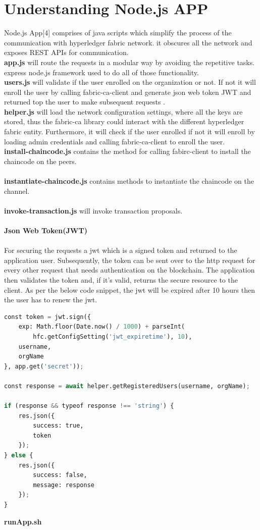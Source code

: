 \section{Understanding Node.js APP} 
Node.js App[4] comprises of java scripts which simplify the process of the communication with hyperledger fabric network. it obscures all the network and exposes REST APIs for communication.
\ \\ 
\textbf{app.js} will route the requests in a modular way by avoiding the repetitive tasks. express node.js framework used to do all of those functionality. 
\ \\ 
\textbf{users.js} will validate if the user enrolled on the organization or not. If not it will enroll the user by calling fabric-ca-client and generate json web token JWT and returned top the user to make subsequent requests . 
\ \\ 
\textbf{helper.js} will load the network configuration settings, where all the keys are stored, thus the fabric-ca library could interact with the different hyperledger fabric entity. Furthermore, it will check if the user enrolled if not it will enroll by loading admin credentials and calling fabric-ca-client to enroll the user.
\ \\ 
\textbf{install-chaincode.js} contains the method for calling fabirc-client to install the chaincode on the peers.  \\ 
\ \\ 
\textbf{instantiate-chaincode.js} contains methods to instantiate the chaincode on the channel.  \\ 
\ \\  
\textbf{invoke-transaction.js} will invoke transaction proposals. \\
\ \\
\textbf{\large{Json Web Token(JWT)}  }\\ 
\ \\ 
For securing the requests a jwt which is a signed token and returned to the application user.
Subsequently, the token can be sent over to the http request for every other request that needs authentication on the blockchain. The application then validates the token and, if it’s valid, returns the secure resource to the client.
As per the below code snippet, the jwt will be expired after 10 hours then the user has to renew the jwt. \\ 

\begin{lstlisting}[language=Python, caption=JWT Generation]
const token = jwt.sign({
    exp: Math.floor(Date.now() / 1000) + parseInt(
        hfc.getConfigSetting('jwt_expiretime'), 10),
    username,
    orgName
}, app.get('secret'));

const response = await helper.getRegisteredUsers(username, orgName);

if (response && typeof response !== 'string') {
    res.json({
        success: true,
        token
    });
} else {
    res.json({
        success: false,
        message: response
    });
}
\end{lstlisting}
\cleardoublepage
\textbf{\large{runApp.sh}  }\\

